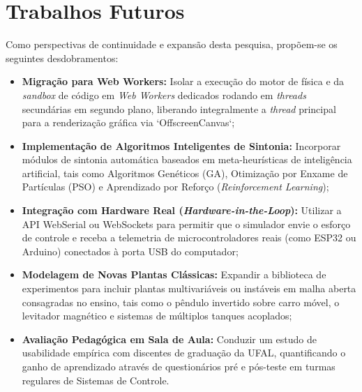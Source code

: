 \section{Trabalhos Futuros}
\label{sec:trabalhos_futuros}

Como perspectivas de continuidade e expansão desta pesquisa, propõem-se os seguintes desdobramentos:

\begin{itemize}
    \item \textbf{Migração para Web Workers:} Isolar a execução do motor de física e da \textit{sandbox} de código em \textit{Web Workers} dedicados rodando em \textit{threads} secundárias em segundo plano, liberando integralmente a \textit{thread} principal para a renderização gráfica via `OffscreenCanvas`;
    \item \textbf{Implementação de Algoritmos Inteligentes de Sintonia:} Incorporar módulos de sintonia automática baseados em meta-heurísticas de inteligência artificial, tais como Algoritmos Genéticos (GA), Otimização por Enxame de Partículas (PSO) e Aprendizado por Reforço (\textit{Reinforcement Learning});
    \item \textbf{Integração com Hardware Real (\textit{Hardware-in-the-Loop}):} Utilizar a API WebSerial ou WebSockets para permitir que o simulador envie o esforço de controle e receba a telemetria de microcontroladores reais (como ESP32 ou Arduino) conectados à porta USB do computador;
    \item \textbf{Modelagem de Novas Plantas Clássicas:} Expandir a biblioteca de experimentos para incluir plantas multivariáveis ou instáveis em malha aberta consagradas no ensino, tais como o pêndulo invertido sobre carro móvel, o levitador magnético e sistemas de múltiplos tanques acoplados;
    \item \textbf{Avaliação Pedagógica em Sala de Aula:} Conduzir um estudo de usabilidade empírica com discentes de graduação da UFAL, quantificando o ganho de aprendizado através de questionários pré e pós-teste em turmas regulares de Sistemas de Controle.
\end{itemize}
